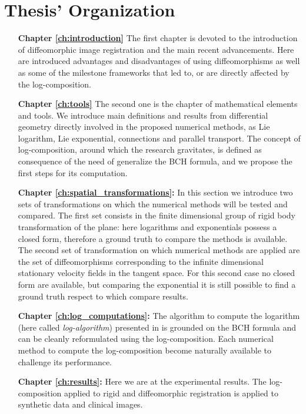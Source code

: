 \section*{Thesis' Organization}
\begin{enumerate}
	\item[{\bf Chapter \ref{ch:introduction}}] The first chapter is devoted to the introduction of diffeomorphic image registration and the main recent advancements. Here are introduced advantages and disadvantages of using diffeomorphisms as well as some of the milestone frameworks that led to, or are directly affected by the log-composition.
	
	\item[{\bf Chapter \ref{ch:tools}}] The second one is the chapter of mathematical elements and tools. We introduce main definitions and results from differential geometry directly involved in the proposed numerical methods, as Lie logarithm, Lie exponential, connections and parallel transport.
	The concept of log-composition, around which the research gravitates, is defined as consequence of the need of generalize the BCH formula, and we propose the first steps for its computation. 
	
	\item[{\bf Chapter \ref{ch:spatial_transformations}:}] In this section we introduce two sets of transformations on which the numerical methods will be tested and compared. The first set consists in the finite dimensional group of rigid body transformation of the plane: here logarithms and exponentials possess a closed form, therefore a ground truth to compare the methods is available.
	The second set of transformation on which numerical methods are applied are the set of diffeomorphisms corresponding to the infinite dimensional stationary velocity fields in the tangent space. For this second case no closed form are available, but comparing the exponential it is still possible to find a ground truth respect to which compare results.
	
	\item[{\bf Chapter \ref{ch:log_computations}:}] The algorithm to compute the logarithm (here called \emph{log-algorithm}) presented in \cite{Bossa2007} is grounded on the BCH formula and can be cleanly reformulated using the log-composition. Each numerical method to compute the log-composition become naturally available to challenge its performance.
  
	\item[{\bf Chapter \ref{ch:results}:}] Here we are at the experimental results. The log-composition applied to rigid and diffeomorphic registration is applied to synthetic data and clinical images. \\
	
	
\end{enumerate}









